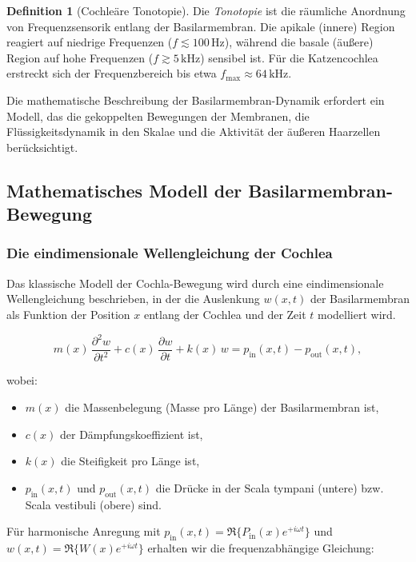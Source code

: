 ﻿\documentclass[12pt, a4paper]{article}
\theoremstyle{definition}
\newtheorem{definition}{Definition}[section]
\theoremstyle{remark}
\begin{document}
\begin{definition}[Cochleäre Tonotopie]
Die \textit{Tonotopie} ist die räumliche Anordnung von Frequenzsensorik entlang 
der Basilarmembran. Die apikale (innere) Region reagiert auf niedrige Frequenzen 
($f \lesssim 100\,\mathrm{Hz}$), während die basale (äußere) Region auf hohe 
Frequenzen ($f \gtrsim 5\,\mathrm{kHz}$) sensibel ist. Für die Katzencochlea 
erstreckt sich der Frequenzbereich bis etwa $f_{\max} \approx 64\,\mathrm{kHz}$.
\end{definition}

Die mathematische Beschreibung der Basilarmembran-Dynamik erfordert ein 
Modell, das die gekoppelten Bewegungen der Membranen, die Flüssigkeitsdynamik 
in den Skalae und die Aktivität der äußeren Haarzellen berücksichtigt.

\subsection{Mathematisches Modell der Basilarmembran-Bewegung}

\subsubsection{Die eindimensionale Wellengleichung der Cochlea}

Das klassische Modell der Cochla-Bewegung wird durch eine eindimensionale 
Wellengleichung beschrieben, in der die Auslenkung $w(x,t)$ der Basilarmembran 
als Funktion der Position $x$ entlang der Cochlea und der Zeit $t$ modelliert wird.

\begin{equation}
\label{eq:cochlear_wave}
m(x)\,\frac{\partial^2 w}{\partial t^2} 
+ c(x)\,\frac{\partial w}{\partial t} 
+ k(x)\,w 
= p_{\mathrm{in}}(x,t) - p_{\mathrm{out}}(x,t),
\end{equation}

wobei:
\begin{itemize}
\item $m(x)$ die Massenbelegung (Masse pro Länge) der Basilarmembran ist,
\item $c(x)$ der Dämpfungskoeffizient ist,
\item $k(x)$ die Steifigkeit pro Länge ist,
\item $p_{\mathrm{in}}(x,t)$ und $p_{\mathrm{out}}(x,t)$ die Drücke 
  in der Scala tympani (untere) bzw. Scala vestibuli (obere) sind.
\end{itemize}

Für harmonische Anregung mit $p_{\mathrm{in}}(x,t) = \Re\{ P_{\mathrm{in}}(x) 
e^{+i\omega t} \}$ und $w(x,t) = \Re\{ W(x) e^{+i\omega t} \}$ erhalten wir 
die frequenzabhängige Gleichung:
\end{document}
